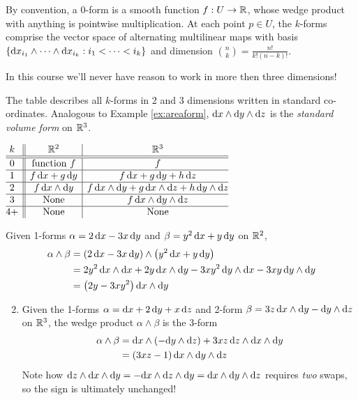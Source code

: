 By convention, a 0-form is a smooth function $f:U\to\mathbb{R}$, whose wedge product with anything is pointwise multiplication. At each point $p\in U$, the $k$-forms comprise the vector space of alternating multilinear maps with basis $\{{\mathrm{d} x}_{i_1}\wedge\cdots\wedge{\mathrm{d}x}_{i_k}:i_1<\cdots<i_k\}$ and dimension $\binom nk=\frac{n!}{k!(n-k)!}$.\smallbreak

In this course we'll never have reason to work in more then three dimensions!\smallbreak


\begin{minipage}[t]{0.44\linewidth}\vspace{0pt}
The table describes all $k$-forms in 2 and 3 dimensions written in standard co-ordinates.\smallbreak
Analogous to Example \ref{ex:areaform}, ${\mathrm{d} x}\wedge{\mathrm{d}y}\wedge{\mathrm{d}z}$ is the \emph{standard volume form} on $\mathbb{R}^3$.
\end{minipage}\hfill\begin{minipage}[t]{0.52\linewidth}\vspace{0pt}
\flushright$\begin{array}{@{}c||c|c@{}}
	k&\R^2&\R^3\\\hline\hline
	0&\text{function }f&f\\\hline
	1&f\,\dx+g\,\dy & f\,\dx+g\,\dy+h\,\dz\\\hline
	2&f\,\dx\wedge\dy&f\,\dx\wedge\dy+g\,\dx\wedge\dz +h\,\dy\wedge\dz\\\hline
	3&\text{None}&f\,\dx\wedge\dy\wedge\dz\\\hline
	4+&\text{None}&\text{None}
\end{array}$
\end{minipage}


\begin{examples}{}{}
	\exstart Given 1-forms $\alpha=2\,{\mathrm{d} x}-3x\,{\mathrm{d} y}$ and $\beta=y^2\,{\mathrm{d} x}+y\,{\mathrm{d} y}$ on $\mathbb{R}^2$,
	\begin{align*}
		\alpha\wedge\beta&=(2\,{\mathrm{d} x}-3x\,{\mathrm{d} y})\wedge\bigl(y^2\,{\mathrm{d} x}+y\,{\mathrm{d} y}\bigr)\\
		&=2y^2\,{\mathrm{d} x}\wedge{\mathrm{d}x} +2y\,{\mathrm{d} x}\wedge{\mathrm{d}y} -3xy^2\,{\mathrm{d} y}\wedge{\mathrm{d}x} -3xy\,{\mathrm{d} y}\wedge{\mathrm{d}y}\\
		&=\bigl(2y-3xy^2\bigr)\,{\mathrm{d} x}\wedge{\mathrm{d}y}
	\end{align*}
	
	\begin{enumerate}\setcounter{enumi}{1}
		\item Given the 1-forms $\alpha={\mathrm{d} x}+2\,{\mathrm{d} y}+x\,{\mathrm{d} z}$ and 2-form $\beta=3z\,{\mathrm{d} x}\wedge{\mathrm{d}y}-{\mathrm{d} y}\wedge{\mathrm{d}z}$ on $\mathbb{R}^3$, the wedge product $\alpha\wedge\beta$ is the 3-form
		\begin{align*}
			\alpha\wedge\beta&={\mathrm{d} x}\wedge(-{\mathrm{d} y}\wedge{\mathrm{d}z})+3xz\,{\mathrm{d} z}\wedge{\mathrm{d}x}\wedge{\mathrm{d}y}\\
			&=(3xz-1)\,{\mathrm{d} x}\wedge{\mathrm{d}y}\wedge{\mathrm{d}z}
		\end{align*}
		Note how ${\mathrm{d} z}\wedge{\mathrm{d}x}\wedge{\mathrm{d}y}=-{\mathrm{d} x}\wedge{\mathrm{d}z}\wedge{\mathrm{d}y}={\mathrm{d} x}\wedge{\mathrm{d}y}\wedge{\mathrm{d}z}$ requires \emph{two} swaps, so the sign is ultimately unchanged!
	\end{enumerate}
\end{examples}



